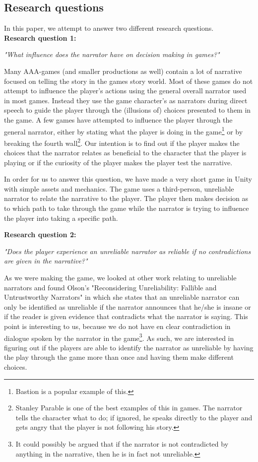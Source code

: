 \subsection{Research questions}
\label{Method_Research}

In this paper, we attempt to answer two different research questions.\\

\textbf{Research question 1:}
\begin{center}
\textit{"What influence does the narrator have on decision making in games?"}
\end{center}
Many AAA-games (and smaller productions as well) contain a lot of narrative focused on telling the story in the games story world. Most of these games do not attempt to influence the player's actions using the general overall narrator used in most games. Instead they use the game character's as narrators during direct speech to guide the player through the (illusions of) choices presented to them in the game. A few games have attempted to influence the player through the general narrator, either by stating what the player is doing in the game\footnote{Bastion is a popular example of this.} or by breaking the fourth wall\footnote{Stanley Parable is one of the best examples of this in games. The narrator tells the character what to do; if ignored, he speaks directly to the player and gets angry that the player is not following his story.}. Our intention is to find out if the player makes the choices that the narrator relates as beneficial to the character that the player is playing or if the curiosity of the player makes the player test the narrative.

In order for us to answer this question, we have made a very short game in Unity with simple assets and mechanics. The game uses a third-person, unreliable narrator to relate the narrative to the player. The player then makes decision as to which path to take through the game while the narrator is trying to influence the player into taking a specific path.

\textbf{Research question 2:}
\begin{center}
\textit{"Does the player experience an unreliable narrator as reliable if no contradictions are given in the narrative?"}
\end{center}
As we were making the game, we looked at other work relating to unreliable narrators and found Olson's "Reconsidering Unreliability: Fallible and Untrustworthy Narrators" in which she states that an unreliable narrator can only be identified as unreliable if the narrator announces that he/she is insane or if the reader is given evidence that contradicts what the narrator is saying\cite[p. 104]{Olson}. This point is interesting to us, because we do not have en clear contradiction in dialogue spoken by the narrator in the game\footnote{It could possibly be argued that if the narrator is not contradicted by anything in the narrative, then he is in fact not unreliable.}. As such, we are interested in figuring out if the players are able to identify the narrator as unreliable by having the play through the game more than once and having them make different choices.